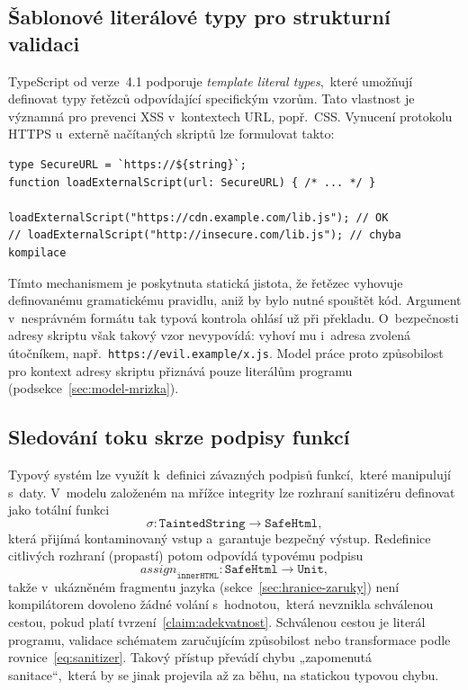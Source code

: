 \subsection{Šablonové literálové typy pro strukturní validaci}

TypeScript od verze~4.1 podporuje \emph{template literal types},~které umožňují definovat typy řetězců odpovídající specifickým vzorům. Tato vlastnost je významná pro prevenci XSS v~kontextech URL, popř.~CSS. Vynucení protokolu HTTPS u~externě načítaných skriptů lze formulovat takto:

\begin{verbatim}
type SecureURL = `https://${string}`;
function loadExternalScript(url: SecureURL) { /* ... */ }

loadExternalScript("https://cdn.example.com/lib.js"); // OK
// loadExternalScript("http://insecure.com/lib.js"); // chyba kompilace
\end{verbatim}

Tímto mechanismem je poskytnuta statická jistota, že řetězec vyhovuje definovanému gramatickému pravidlu, aniž by bylo nutné spouštět kód. Argument v~nesprávném formátu tak typová kontrola ohlásí už při překladu. O~bezpečnosti adresy skriptu však takový vzor nevypovídá: vyhoví mu i~adresa zvolená útočníkem, např.~\texttt{https://evil.example/x.js}. Model práce proto způsobilost pro kontext adresy skriptu přiznává pouze literálům programu (podsekce~\ref{sec:model-mrizka}).

\subsection{Sledování toku skrze podpisy funkcí}

Typový systém lze využít k~definici závazných podpisů funkcí,~které manipulují s~daty. V~modelu založeném na mřížce integrity lze rozhraní sanitizéru definovat jako totální funkci
\begin{equation}
    \sigma : \mathtt{TaintedString} \longrightarrow \mathtt{SafeHtml},
    \label{eq:sanitizer}
\end{equation}
která přijímá kontaminovaný vstup a~garantuje bezpečný výstup. Redefinice citlivých rozhraní (propastí) potom odpovídá typovému podpisu
\begin{equation}
    \mathit{assign}_{\mathtt{innerHTML}} : \mathtt{SafeHtml} \longrightarrow \mathtt{Unit},
    \label{eq:sink-contract}
\end{equation}
takže v~ukázněném fragmentu jazyka (sekce~\ref{sec:hranice-zaruky}) není kompilátorem dovoleno žádné volání s~hodnotou,~která nevznikla schválenou cestou, pokud platí tvrzení~\ref{claim:adekvatnost}. Schválenou cestou je literál programu, validace schématem zaručujícím způsobilost nebo transformace podle rovnice~\ref{eq:sanitizer}. Takový přístup převádí chybu „zapomenutá sanitace“,~která by se jinak projevila až za běhu, na statickou typovou chybu.

